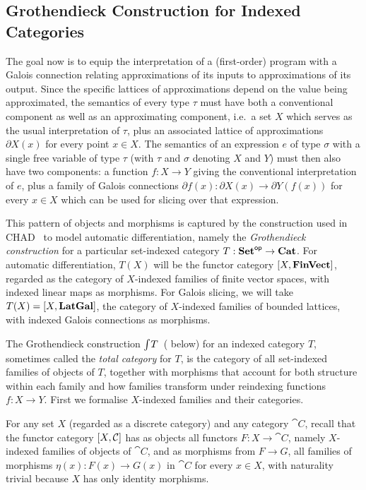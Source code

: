 \subsection{Grothendieck Construction for Indexed Categories}
\label{sec:Grothendieck}

The goal now is to equip the interpretation of a (first-order) program with a Galois connection relating
approximations of its inputs to approximations of its output. Since the specific lattices of approximations
depend on the value being approximated, the semantics of every type $\tau$ must have both a conventional
component as well as an approximating component, i.e.~a set $X$ which serves as the usual interpretation of
$\tau$, plus an associated lattice of approximations $\partial X(x)$ for every point $x \in X$. The semantics
of an expression $e$ of type $\sigma$ with a single free variable of type $\tau$ (with $\tau$ and $\sigma$
denoting $X$ and $Y$) must then also have two components: a function $f: X \to Y$ giving the conventional
interpretation of $e$, plus a family of Galois connections $\partial f(x): \partial X(x) \to \partial Y(f(x))$
for every $x \in X$ which can be used for slicing over that expression.

This pattern of objects and morphisms is captured by the construction used in CHAD~\cite{vákár22,nunes2023} to
model automatic differentiation, namely the \emph{Grothendieck construction} for a particular set-indexed
category $T: \mathbf{Set}^{\mathsf{op}} \to \mathbf{Cat}$. For automatic differentiation, $T(X)$ will be the functor category
$[X,\mathbf{FinVect}]$, regarded as the category of $X$-indexed families of finite vector spaces, with indexed
linear maps as morphisms. For Galois slicing, we will take $T(X) = [X,\mathbf{LatGal}]$, the category of
$X$-indexed families of bounded lattices, with indexed Galois connections as morphisms.

The Grothendieck construction $\int_{}T$~( below) for an indexed category $T$,
sometimes called the \emph{total category} for $T$, is the category of all set-indexed families of objects of
$T$, together with morphisms that account for both structure within each family and how families transform
under reindexing functions $f: X \to Y$. First we formalise $X$-indexed families and their categories.

\begin{definition}
For any set $X$ (regarded as a discrete category) and any category $\cat{C}$, recall that the functor
category $[X,\mathcal{C}]$ has as objects all functors $F: X \to \cat{C}$, namely $X$-indexed families of
objects of $\cat{C}$, and as morphisms from $F \to G$, all families of morphisms $\eta(x): F(x) \to G(x)$ in
$\cat{C}$ for every $x \in X$, with naturality trivial because $X$ has only identity morphisms.
\end{definition}

